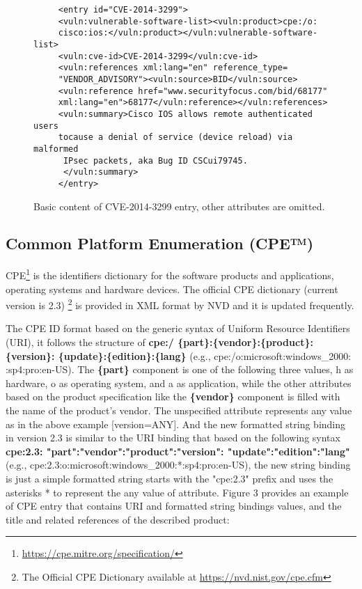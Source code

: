\documentclass{llncs}
\begin{document}
 \begin{figure}
   
      \lstset{language=XML}
       \begin{lstlisting}
     <entry id="CVE-2014-3299">
     <vuln:vulnerable-software-list><vuln:product>cpe:/o:
     cisco:ios:</vuln:product></vuln:vulnerable-software-list>
     <vuln:cve-id>CVE-2014-3299</vuln:cve-id>
     <vuln:references xml:lang="en" reference_type=
     "VENDOR_ADVISORY"><vuln:source>BID</vuln:source>
     <vuln:reference href="www.securityfocus.com/bid/68177"
     xml:lang="en">68177</vuln:reference></vuln:references>
     <vuln:summary>Cisco IOS allows remote authenticated users 
     tocause a denial of service (device reload) via malformed
      IPsec packets, aka Bug ID CSCui79745.
      </vuln:summary>
     </entry>
       \end{lstlisting}
      \caption{Basic content of CVE-2014-3299 entry, other attributes are omitted.}
       \end{figure}
 
 \subsection{Common Platform Enumeration (CPE™)}
 CPE\footnote{\url{https://cpe.mitre.org/specification/}} is the identifiers dictionary for the software products and applications, operating systems and hardware devices. The official CPE dictionary (current version is 2.3) \footnote{The Official CPE Dictionary available at \url{https://nvd.nist.gov/cpe.cfm}} is provided in XML format by NVD and it is updated frequently.
 \par The CPE ID format based on the generic syntax of Uniform Resource Identifiers (URI), it follows the structure of \textbf{cpe:/ \{part\}:\{vendor\}:\{product\}:
 \{version\}:
 \{update\}:\{edition\}:\{lang\}} (e.g., cpe:/o:microsoft:windows\_2000:
 :sp4:pro:en-US). The \textbf{\{part\}} component is one of the following three values, h as hardware, o as operating system, and a as application, while the other attributes based on the product specification like the \textbf{\{vendor\}} component is filled with the name of the product's vendor. The unspecified attribute represents any value as in the above example [version=ANY]. And  the new formatted string binding in version 2.3  is similar to the URI binding that based on the following syntax \textbf{cpe:2.3: "part":"vendor":"product":"version":
  "update":"edition":"lang"} (e.g., cpe:2.3:o:microsoft:windows\_2000:*:sp4:pro:en-US), the new string binding is just a simple formatted string starts with the  "cpe:2.3" prefix and uses the asterisks * to represent the any value of attribute. Figure 3 provides an example of CPE entry that contains URI and formatted string bindings values, and the title and related references of the described product: 
  
\end{document}
